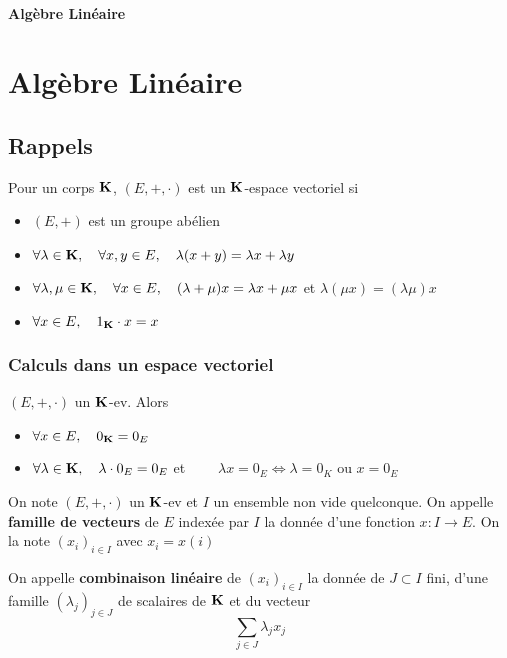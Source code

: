 \ifsolo
    ~

    \vspace{1cm}

    \begin{center}
        \textbf{\LARGE Algèbre Linéaire} \\[1em]
    \end{center}
    \tableofcontents
\else
    \chapter{Algèbre Linéaire}

    \minitoc
\fi
\thispagestyle{empty}

\section{Rappels}

\begin{dfn}
    Pour un corps $\mathbf K$, $(E, +, \cdot)$ est un  $\mathbf K$-espace vectoriel si \begin{itemize}
        \item $(E, +)$ est un groupe abélien
        \item $\forall \lambda \in \mathbf K,\quad \forall  x,y\in E,\quad \lambda(x+y)=\lambda x+\lambda y$
        \item $\forall \lambda,\mu \in  \mathbf K,\quad  \forall  x \in  E,\quad (\lambda+\mu)x=\lambda x+\mu x$ et $\lambda(\mu x)=(\lambda\mu)x$
        \item $\forall x \in  E, \quad  1_{\mathbf K}\cdot x=x$
    \end{itemize}
\end{dfn}

\subsection{Calculs dans un espace vectoriel}

\begin{rem}[Rappel]
    $(E, +, \cdot)$ un  $\mathbf K$-ev. Alors \begin{itemize}
        \item $\forall  x \in  E,\quad 0_{\mathbf K}=0_E$
        \item $\forall  \lambda \in  \mathbf K,\quad  \lambda \cdot 0_E=0_E$ et $\qquad \lambda x=0_E \iff \lambda=0_K$ ou $x=0_E$
    \end{itemize}
\end{rem}

\begin{dfn}
    On note $(E, +, \cdot)$ un  $\mathbf K$-ev et $I$ un ensemble non vide quelconque. On appelle  \textbf{famille de vecteurs} de $E$ indexée par  $I$ la donnée d'une fonction  $x:I\to E$. On la note $(x_i)_{i \in  I}$ avec $x_i=x(i)$
    
    On appelle \textbf{combinaison linéaire} de $(x_i)_{i \in  I}$ la donnée de $J\subset I$ fini, d'une famille  $(\lambda_j)_{j \in  J}$ de scalaires de $\mathbf K$ et du vecteur \[
    \sum_{j \in  J} \lambda_j x_j
    \] 
\end{dfn}

